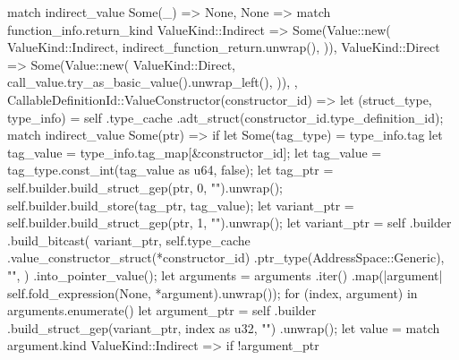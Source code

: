 \documentclass[
  oneside,
  english,
  coorientadorbanca,
  noabntexcite
]{ufsc-thesis-rn46-2019}
\begin{document}
\begin{rustcode}
{{{{                match indirect_value {
                    Some(_) => None,
                    None => match function_info.return_kind {
                        ValueKind::Indirect => Some(Value::new(
                            ValueKind::Indirect,
                            indirect_function_return.unwrap(),
                        )),
                        ValueKind::Direct => Some(Value::new(
                            ValueKind::Direct,
                            call_value.try_as_basic_value().unwrap_left(),
                        )),
                    },
                }
            }
            CallableDefinitionId::ValueConstructor(constructor_id) => {
                let (struct_type, type_info) = self
                    .type_cache
                    .adt_struct(constructor_id.type_definition_id);
                match indirect_value {
                    Some(ptr) => {
                        if let Some(tag_type) = type_info.tag {
                            let tag_value = type_info.tag_map[&constructor_id];
                            let tag_value = tag_type.const_int(tag_value as u64, false);
                            let tag_ptr = self.builder.build_struct_gep(ptr, 0, "").unwrap();
                            self.builder.build_store(tag_ptr, tag_value);
                            let variant_ptr = self.builder.build_struct_gep(ptr, 1, "").unwrap();
                            let variant_ptr = self
                                .builder
                                .build_bitcast(
                                    variant_ptr,
                                    self.type_cache
                                        .value_constructor_struct(*constructor_id)
                                        .ptr_type(AddressSpace::Generic),
                                    "",
                                )
                                .into_pointer_value();
                            let arguments = arguments
                                .iter()
                                .map(|argument| self.fold_expression(None, *argument).unwrap());
                            for (index, argument) in arguments.enumerate() {
                                let argument_ptr = self
                                    .builder
                                    .build_struct_gep(variant_ptr, index as u32, "")
                                    .unwrap();
                                let value = match argument.kind {
                                    ValueKind::Indirect => {
                                        if !argument_ptr
}}}}}}}}}}
\end{rustcode}
\end{document}
